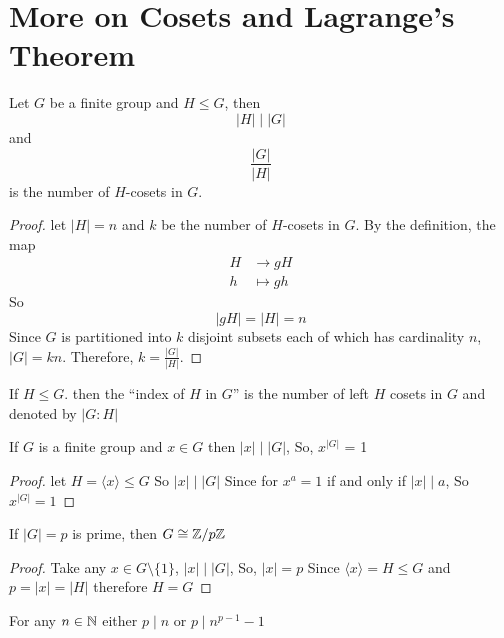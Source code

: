 \section{More on Cosets and Lagrange's Theorem}

\begin{theorem}
  Let $G$ be a finite group and $H \le G$, then $$|H| \mid |G|$$  
  and $$\frac{|G|}{|H|}$$ is the number of $H$-cosets in $G$.
\end{theorem}

\begin{proof}
  let $|H| = n$ and $k$ be the number of $H$-cosets in $G$. By the definition, the map
  \begin{align*}
    H &\to gH \\
    h &\mapsto gh
  \end{align*}
  So
  \[|gH| = |H| = n\]
  Since $G$ is partitioned into $k$ disjoint subsets each of which has cardinality $n$, $|G| = kn$.
  Therefore, $k = \frac{|G|}{|H|}$.
\end{proof}

\begin{definition}
  If $H \le G$. then the ``index of $H$ in $G$'' is the number of 
  left $H$ cosets in $G$ and denoted by $|G : H|$
\end{definition}

\begin{corollary}
  If $G$ is a finite group and $x \in G$ then $|x| \mid |G|$, So, $x^{|G|}$ = 1
\end{corollary}

\begin{proof}
  let $H = \langle x \rangle \le G$ So $|x| \mid |G|$
  Since for $x^a = 1$ if and only if $|x| \mid a$, So $x^{|G|} = 1$
\end{proof}

\begin{corollary}
  If $|G| = p$ is prime, then $G \cong \mathbb Z/p\mathbb Z$
\end{corollary}

\begin{proof}
  Take any $x \in G \setminus \{1\}$, $|x| \mid |G|$, So, $|x| = p$
  Since $\langle x \rangle = H \le G$ and $p = |x| = |H|$ therefore $H = G$
\end{proof}

\begin{theorem}
  For any $n \in \mathbb N$ either $p \mid n$ or $p \mid n^{p-1} -1$
\end{theorem}

